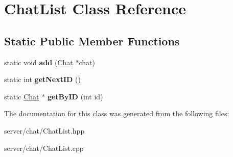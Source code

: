 \hypertarget{class_chat_list}{\section{Chat\-List Class Reference}
\label{class_chat_list}
}
\subsection*{Static Public Member Functions}
\begin{DoxyCompactItemize}
\item 
\hypertarget{class_chat_list_a1c017e8b06973f14f6412516aa394e52}{static void {\bfseries add} (\hyperlink{class_chat}{Chat} $\ast$chat)}\label{class_chat_list_a1c017e8b06973f14f6412516aa394e52}

\item 
\hypertarget{class_chat_list_aa28f5903d7cb3e5b1600270b0a752bbf}{static int {\bfseries get\-Next\-I\-D} ()}\label{class_chat_list_aa28f5903d7cb3e5b1600270b0a752bbf}

\item 
\hypertarget{class_chat_list_a218997f1865154d88f0928c6669fd434}{static \hyperlink{class_chat}{Chat} $\ast$ {\bfseries get\-By\-I\-D} (int id)}\label{class_chat_list_a218997f1865154d88f0928c6669fd434}

\end{DoxyCompactItemize}


The documentation for this class was generated from the following files\-:\begin{DoxyCompactItemize}
\item 
server/chat/Chat\-List.\-hpp\item 
server/chat/Chat\-List.\-cpp\end{DoxyCompactItemize}
